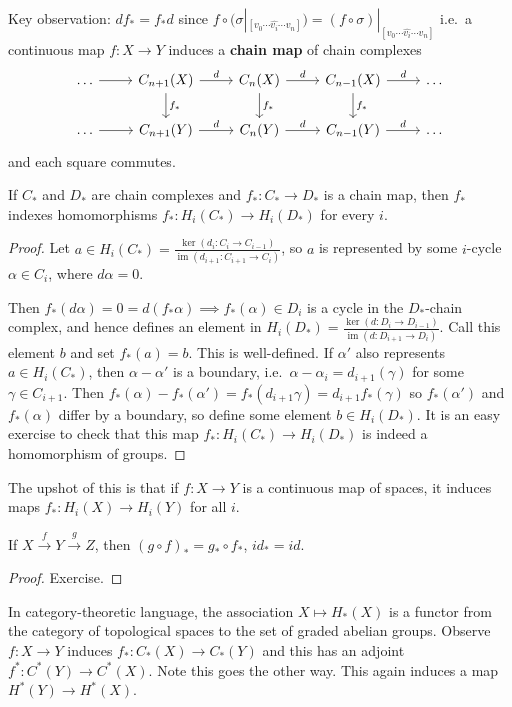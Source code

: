\documentclass{article}
\DeclareMathOperator{\im}{im}
\begin{document}
Key observation: $df_* = f_*d$ since $f \circ (\sigma|_{[v_0 \dotsm \hat{v_i} \dotsm v_n]}) = (f \circ \sigma)|_{[v_0 \dotsm \hat{v_i} \dotsm v_n]}$
i.e.\ a continuous map $f: X \to Y$ induces a \textbf{chain map} of chain complexes
\begin{equation*}
  \begin{tikzcd}
    \dots \rar & C_{n+1}(X) \rar{d} \dar{f_*} & C_n(X) \rar{d} \dar{f_*} & C_{n-1}(X) \rar{d} \dar{f_*} & \dots \\
    \dots \rar & C_{n+1}(Y) \rar{d}  & C_n(Y) \rar{d}  & C_{n-1}(Y) \rar{d}  & \dots
  \end{tikzcd}
\end{equation*}
and each square commutes.
\begin{lemma}
  If $C_*$ and $D_*$ are chain complexes and $f_*:C_* \to D_*$ is a chain map, then $f_*$ indexes homomorphisms $f_*:H_i(C_*) \to H_i(D_*)$ for every $i$.
\end{lemma}
\begin{proof}
  Let $a \in H_i(C_*) = \frac{\ker(d_i:C_i \to C_{i-1})}{\im(d_{i+1}:C_{i+1} \to C_i)}$, so $a$ is represented by some $i$-cycle $\alpha \in C_i$, where $d \alpha = 0$.

  Then $f_*(d\alpha) = 0 = d(f_* \alpha) \implies f_*(\alpha) \in D_i$ is a cycle in the $D_*$-chain complex, and hence defines an element in $H_i(D_*) = \frac{\ker(d:D_i \to D_{i-1})}{\im(d:D_{i+1}\to D_i)}$. Call this element $b$ and set $f_*(a) = b$.
  This is well-defined.
  If $\alpha'$ also represents $a \in H_i(C_*)$, then $\alpha-\alpha'$ is a boundary, i.e.\ $\alpha-\alpha_i = d_{i+1}(\gamma)$ for some $\gamma \in C_{i+1}$.
  Then $f_*(\alpha) - f_*(\alpha') = f_*(d_{i+1}\gamma) = d_{i+1} f_*(\gamma)$ so $f_*(\alpha')$ and $f_*(\alpha)$ differ by a boundary, so define some element $b \in H_i(D_*)$.
  It is an easy exercise to check that this map $f_*:H_i(C_*) \to H_i(D_*)$ is indeed a homomorphism of groups.
\end{proof}
The upshot of this is that if $f:X\to Y$ is a continuous map of spaces, it induces maps $f_*:H_i(X) \to H_i(Y)$ for all $i$.
\begin{lemma}
  If $X \xrightarrow{f} Y \xrightarrow{g} Z$, then $(g \circ f)_* = g_* \circ f_*$, $id_* = id$.
\end{lemma}
\begin{proof}
  Exercise.
\end{proof}
In category-theoretic language, the association $X \mapsto H_*(X)$ is a functor from the category of topological spaces to the set of graded abelian groups.
Observe $f:X \to Y$ induces $f_*:C_*(X) \to C_*(Y)$ and this has an adjoint $f^*: C^*(Y) \to C^*(X)$.
Note this goes the other way. This again induces a map $H^*(Y) \to H^*(X)$.
\end{document}
